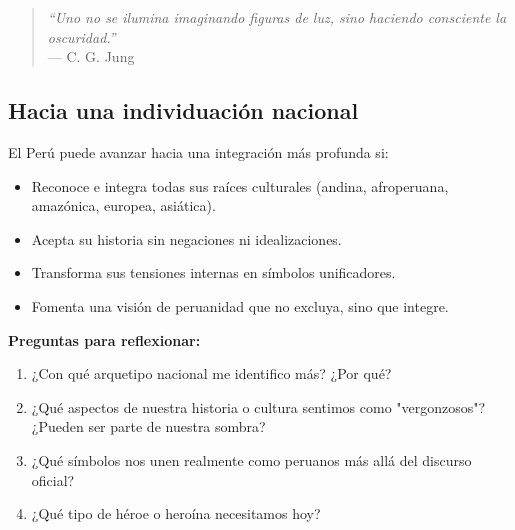 \begin{quote}
	\emph{“Uno no se ilumina imaginando figuras de luz, sino haciendo consciente la oscuridad.”} \\ — C. G. Jung
\end{quote}

\subsection*{Hacia una individuación nacional}
El Perú puede avanzar hacia una integración más profunda si:
\begin{itemize}
	\item Reconoce e integra todas sus raíces culturales (andina, afroperuana, amazónica, europea, asiática).
	\item Acepta su historia sin negaciones ni idealizaciones.
	\item Transforma sus tensiones internas en símbolos unificadores.
	\item Fomenta una visión de peruanidad que no excluya, sino que integre.
\end{itemize}

\textbf{Preguntas para reflexionar:}
\begin{enumerate}
	\item ¿Con qué arquetipo nacional me identifico más? ¿Por qué?
	\item ¿Qué aspectos de nuestra historia o cultura sentimos como "vergonzosos"? ¿Pueden ser parte de nuestra sombra?
	\item ¿Qué símbolos nos unen realmente como peruanos más allá del discurso oficial?
	\item ¿Qué tipo de héroe o heroína necesitamos hoy?
\end{enumerate}